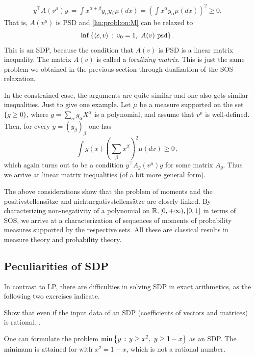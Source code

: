 \begin{align*}
	y^\top A(v^\mu) y \ = \int x^{\alpha + \beta} y_\alpha y_\beta \mu(d x)
 = \left( \int x^\alpha y_\alpha \mu(d x)\right)^2 
 \ge 0.
\end{align*}
That is, $A(v^\mu)$ is PSD and \eqref{lin:probl:on:M} can be relaxed to 
\begin{equation}
	\label{moment:relaxation}
	\inf \left\{ \left\langle c , v \right\rangle \,:\, v_0=1, \ A(v) \ \text{psd} \right\}.
\end{equation}
This is an SDP, because the condition that $A(v)$ is PSD is a linear matrix inequality. The matrix $A(v)$ is called a \emph{localizing matrix}. 
This is just the same problem we obtained in the previous section through dualization of the SOS relaxation. 

In the constrained case, the arguments are quite similar and one also gets similar inequalities. Just to give one example. Let $\mu$ be a measure supported on the set $\{g \ge 0\}$, where $g = \sum_\alpha g_\alpha X^\alpha$ is a polynomial, and assume that $v^\mu$ is well-defined. Then, for every $y=(y_\beta)_\beta$ one has
\[
	\int g(x) \left( \sum_\beta x^\beta \right)^2 \mu( d x) \ge 0 \,,
\] 
which again turns out to be a condition $y^\top A_g(v^\mu) y$ for some matrix $A_g$. Thus we arrive at linear matrix inequalities (of a bit more general form). 

The above considerations show that the problem of moments and the positivstellens{\"a}tze and nichtnegativstellensätze are closely linked. By characterizing non-negativity of a polynomial on $\mathbb{R}, [0,+\infty),[0,1]$ in terms of SOS, we arrive at a characterization of sequences of moments of probability measures supported by the respective sets. All these are classical results in measure theory and probability theory.
 

\subsection{Peculiarities of SDP}

In contrast to LP, there are difficulties in solving SDP in exact arithmetics, as the following two exercises indicate. 

\begin{exercise}
	Show that even if the input data of an SDP (coefficients of vectors and matrices) is rational, .
\end{exercise}
\begin{solution}
	One can formulate the problem $\min \left\{ y \,:\, y \ge x^2, \ y \ge 1 -x \right\}$ as an SDP. The minimum is attained for  with $x^2 = 1 -x$, which is not a rational number.
\end{solution}

